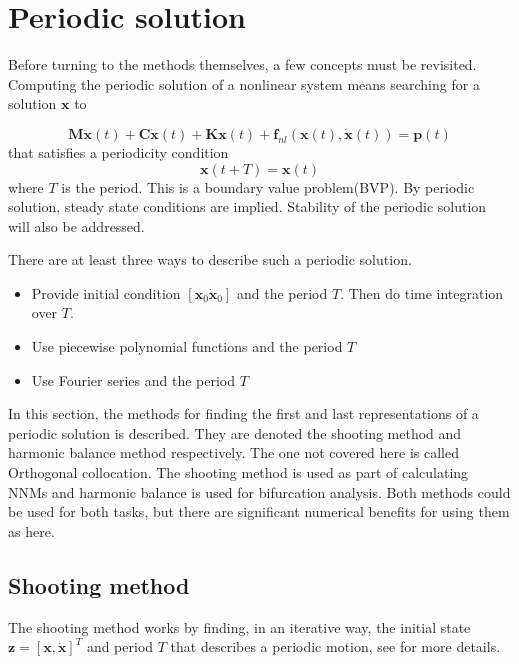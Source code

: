 

\section{Periodic solution}
\label{sec:periodic-solution}

Before turning to the methods themselves, a few concepts must be revisited.
Computing the periodic solution of a nonlinear system means searching for a
solution $\bm x$ to

\begin{equation}
    \label{eq:per_eom}
  \bm M \ddot{\bm x}(t) + \bm C \dot{\bm x}(t) + \bm K \bm x(t) +
  \bm f_{nl} \left( \bm x(t), \dot{ \bm x}(t) \right) = \bm p (t)
\end{equation}
that satisfies a periodicity condition
\begin{equation}
  \label{eq:per_condtion}
  \bm x(t+T) = \bm x(t)
\end{equation}
where $T$ is the period. This is a boundary value problem(BVP). By periodic
solution, steady state conditions are implied. Stability of the periodic
solution will also be addressed.


There are at least three ways to describe such a periodic solution.

\begin{itemize}
\item Provide initial condition $\left[\bm x_0 \dot{\bm x}_0 \right]$ and the
  period $T$. Then do time integration over $T$.
\item Use piecewise polynomial functions and the period $T$
\item Use Fourier series and the period $T$
\end{itemize}

In this section, the methods for finding the first and last representations of a
periodic solution is described. They are denoted the shooting method and
harmonic balance method respectively. The one not covered here is called
Orthogonal collocation. The shooting method is used as part of calculating NNMs
and harmonic balance is used for bifurcation analysis. Both methods could be
used for both tasks, but there are significant numerical benefits for using them
as here.


\subsection{Shooting method}
\label{sec:shooting_method}

The shooting method works by finding, in an iterative way, the initial state
$\bm z = [\bm x, \dot{\bm x}]^T$ and period $T$ that describes a periodic
motion, see \textcite{nayfeh2008applied} for more details.

